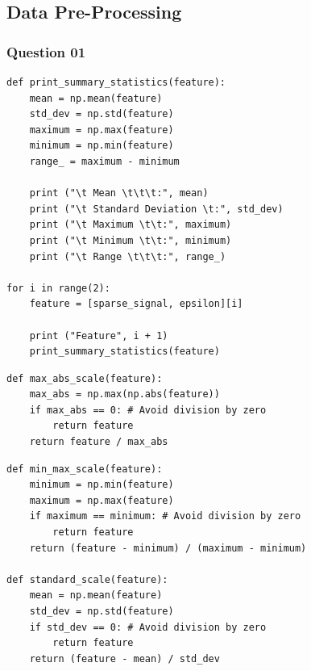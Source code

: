 \documentclass{article}[a4paper]
\begin{document}
	\subsection{Data Pre-Processing}

	\subsubsection{Question 01}
	\begin{lstlisting}[label={q3_1_code_1}, caption={Calculation of Summary Statistics}]
def print_summary_statistics(feature):
    mean = np.mean(feature)
    std_dev = np.std(feature)
    maximum = np.max(feature)
    minimum = np.min(feature)
    range_ = maximum - minimum

    print ("\t Mean \t\t\t:", mean)
    print ("\t Standard Deviation \t:", std_dev)
    print ("\t Maximum \t\t:", maximum)
    print ("\t Minimum \t\t:", minimum)
    print ("\t Range \t\t\t:", range_)

for i in range(2):
    feature = [sparse_signal, epsilon][i]

    print ("Feature", i + 1)
    print_summary_statistics(feature)
	\end{lstlisting}

	\begin{lstlisting}[label=q3_1_code_2, caption={Max-Abs Scaling}]
def max_abs_scale(feature):
    max_abs = np.max(np.abs(feature))
    if max_abs == 0: # Avoid division by zero
        return feature
    return feature / max_abs
	\end{lstlisting}

	\begin{lstlisting}[label=q3_1_code_3, caption={Min-Max and Standard Scaling}]
def min_max_scale(feature):
    minimum = np.min(feature)
    maximum = np.max(feature)
    if maximum == minimum: # Avoid division by zero
        return feature
    return (feature - minimum) / (maximum - minimum)

def standard_scale(feature):
    mean = np.mean(feature)
    std_dev = np.std(feature)
    if std_dev == 0: # Avoid division by zero
        return feature
    return (feature - mean) / std_dev
	\end{lstlisting}
\end{document}
